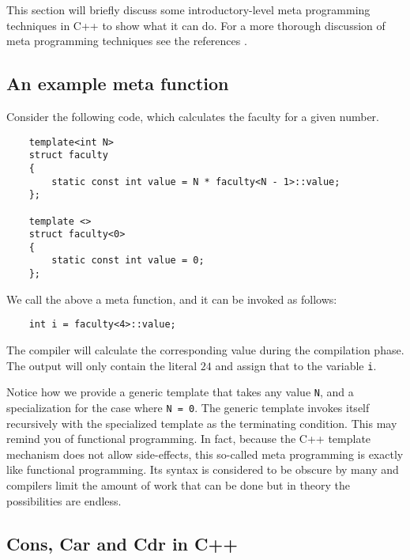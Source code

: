 \documentclass[10pt]{article}
\begin{document}
This section will briefly discuss some introductory-level meta programming techniques in C++ to show what it can do. For a more thorough discussion of meta programming techniques see the references \cite{bib:todd velhuizen meta programming} \cite{bib:boost mpl}\cite{bib:vandevoorde}.

\subsection{An example meta function}

Consider the following code, which calculates the faculty for a given number.
\begin{verbatim}
    template<int N>
    struct faculty
    {
        static const int value = N * faculty<N - 1>::value;
    };

    template <>
    struct faculty<0>
    {
        static const int value = 0;
    };
\end{verbatim}
We call the above a meta function, and it can be invoked as follows:
\begin{verbatim}
    int i = faculty<4>::value;
\end{verbatim}
The compiler will calculate the corresponding value during the
compilation phase. The output will only contain the literal $24$
and assign that to the variable \verb"i".

Notice how we provide a generic template that takes any value \verb"N", and a specialization for the case where \verb"N = 0". The generic template invokes itself recursively with the specialized template as the terminating condition. This may remind you of functional programming. In fact, because the C++ template mechanism does not allow side-effects, this so-called meta programming is exactly like functional programming. Its syntax is considered to be obscure by many and compilers limit the amount of work that can be done but in theory the possibilities are endless.

\subsection{Cons, Car and Cdr in C++}
\end{document}
